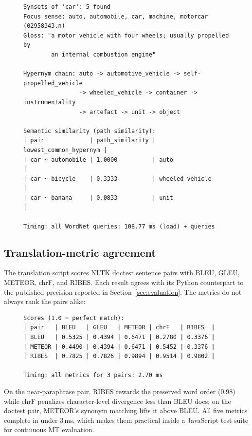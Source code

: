 \documentclass[pdflatex,sn-mathphys-num]{sn-jnl}
\theoremstyle{thmstyleone}
\begin{document}
\begin{figure}[H]
\begin{lstlisting}[basicstyle=\ttfamily\scriptsize,caption={Captured output of \texttt{paper/usecases/wordnet\_query.ts} (abridged).},label={lst:wordnet}]
Synsets of 'car': 5 found
Focus sense: auto, automobile, car, machine, motorcar (02958343.n)
Gloss: "a motor vehicle with four wheels; usually propelled by
        an internal combustion engine"

Hypernym chain: auto -> automotive_vehicle -> self-propelled_vehicle
                -> wheeled_vehicle -> container -> instrumentality
                -> artefact -> unit -> object

Semantic similarity (path similarity):
| pair             | path_similarity | lowest_common_hypernym |
| car ~ automobile | 1.0000          | auto                   |
| car ~ bicycle    | 0.3333          | wheeled_vehicle        |
| car ~ banana     | 0.0833          | unit                   |

Timing: all WordNet queries: 108.77 ms (load) + queries
\end{lstlisting}
\end{figure}

\subsection{Translation-metric agreement}\label{sec:uc-mt}

The translation script scores NLTK doctest sentence pairs with BLEU, GLEU, METEOR, chrF, and RIBES. Each result agrees with its Python counterpart to the published precision reported in Section~\ref{sec:evaluation}. The metrics do not always rank the pairs alike:

\begin{figure}[H]
\begin{lstlisting}[basicstyle=\ttfamily\scriptsize,caption={Captured output of \texttt{paper/usecases/translate\_eval.ts} (abridged).},label={lst:mt}]
Scores (1.0 = perfect match):
| pair   | BLEU   | GLEU   | METEOR | chrF   | RIBES  |
| BLEU   | 0.5325 | 0.4394 | 0.6471 | 0.2780 | 0.3376 |
| METEOR | 0.4490 | 0.4394 | 0.6471 | 0.5452 | 0.3376 |
| RIBES  | 0.7825 | 0.7826 | 0.9894 | 0.9514 | 0.9802 |

Timing: all metrics for 3 pairs: 2.70 ms
\end{lstlisting}
\end{figure}

On the near-paraphrase pair, RIBES rewards the preserved word order ($0.98$) while chrF penalizes character-level divergence less than BLEU does; on the doctest pair, METEOR's synonym matching lifts it above BLEU. All five metrics complete in under 3\,ms, which makes them practical inside a JavaScript test suite for continuous MT evaluation.
\end{document}
